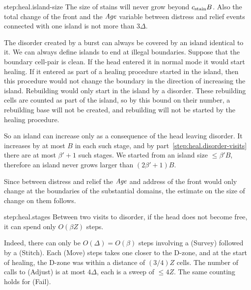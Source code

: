 \documentclass[11pt]{memoir}
\theoremstyle{definition} %
\renewcommand{\le}{\leq}
\newcommand{\fld}[1]{\ensuremath{\textit{#1\/}}}
\def\B{B}
\newcommand{\Z}{Z} %
\newcommand{\Age}{\fld{Age}} %
\newcommand{\cns}[1]{c_{\textrm{\upshape #1}}}
\newcommand{\CStain}{\cns{stain}}
\begin{document}
\begin{Proof}
\begin{step+}{step:heal.island-size}
  The size of stains will never grow beyond  \( \CStain\B \).
Also the total change of the front and the \( \Age \) variable between distress and
relief events connected with one island is not more than \( 3\Delta \).
\end{step+}
\begin{pproof}
  The disorder created by a burst can always be covered by an island identical to it.
   We can always define islands to end at illegal boundaries.  
  Suppose that the boundary cell-pair is clean.
  If the head entered it in normal mode it would start healing.
  If it entered as part of a healing procedure started in the island,
  then this procedure would not change the boundary in the direction
  of increasing the island.
  Rebuilding would only start in the island by a disorder.
These rebuilding cells are counted as part of the island, so by this bound on their number,
a rebuilding base will not be created, and
rebuilding will not be started by the healing procedure.
  
  So an island can increase only as a consequence of the head leaving disorder.
  It increases by at most \( \B \) in each such stage, and by part~\ref{step:heal.disorder-visits}
  there are at most \( \beta'+1 \) such stages.
  We started from an island size \( \le\beta'\B \), therefore an island never grows larger than
  \( (2\beta'+1)\B \).


Since between distress and relief the \( \Age \) and address of the front would only change
at the boundaries of the substantial domains, the estimate on the size of change on them follows.
\end{pproof}

\begin{step+}{step:heal.stages}
  Between two visits to disorder, if the head does not become free, it can spend
  only \( O(\beta\Z) \) steps.
\end{step+} %
\begin{pproof}
  Indeed, there can only be \( O(\Delta)=O(\beta) \) steps involving a (Survey) followed by a (Stitch).
  Each (Move) steps takes one closer to the D-zone, and at the start of healing, the D-zone
  was within a distance of \( (3/4)\Z \) cells.
  The number of calls to (Adjust) is at most \( 4\Delta \), each is a sweep of \( \le 4\Z \).  
  The same counting holds for (Fail).
\end{pproof}
  

\end{Proof}
\end{document}
